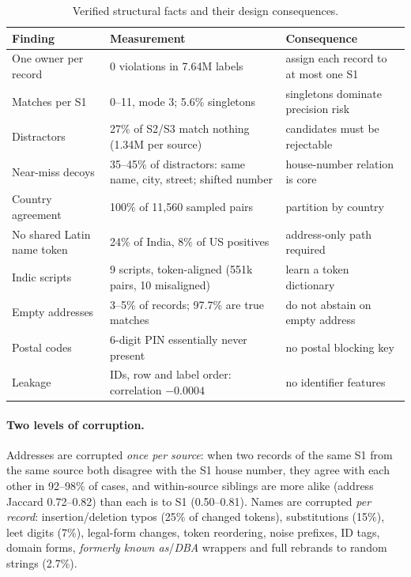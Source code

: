 \documentclass[10pt]{article}
\begin{document}
\begin{table}[htbp]
\centering\small
\caption{Verified structural facts and their design consequences.}
\label{tab:facts}
\begin{tabularx}{\linewidth}{@{}p{3.6cm}Xp{3.9cm}@{}}
\toprule
Finding & Measurement & Consequence \\
\midrule
One owner per record & 0 violations in 7.64M labels & assign each record to at most one S1 \\
Matches per S1 & 0--11, mode 3; 5.6\% singletons & singletons dominate precision risk \\
Distractors & 27\% of S2/S3 match nothing (1.34M per source) & candidates must be rejectable \\
Near-miss decoys & 35--45\% of distractors: same name, city, street; shifted number & house-number relation is core \\
Country agreement & 100\% of 11,560 sampled pairs & partition by country \\
No shared Latin name token & 24\% of India, 8\% of US positives & address-only path required \\
Indic scripts & 9 scripts, token-aligned (551k pairs, 10 misaligned) & learn a token dictionary \\
Empty addresses & 3--5\% of records; 97.7\% are true matches & do not abstain on empty address \\
Postal codes & 6-digit PIN essentially never present & no postal blocking key \\
Leakage & IDs, row and label order: correlation $-0.0004$ & no identifier features \\
\bottomrule
\end{tabularx}
\end{table}

\paragraph{Two levels of corruption.} Addresses are corrupted \emph{once per source}: when two records of the same S1 from the same source both disagree with the S1 house number, they agree with each other in 92--98\% of cases, and within-source siblings are more alike (address Jaccard 0.72--0.82) than each is to S1 (0.50--0.81). Names are corrupted \emph{per record}: insertion/deletion typos (25\% of changed tokens), substitutions (15\%), leet digits (7\%), legal-form changes, token reordering, noise prefixes, ID tags, domain forms, \emph{formerly known as}/\emph{DBA} wrappers and full rebrands to random strings (2.7\%).
\end{document}
